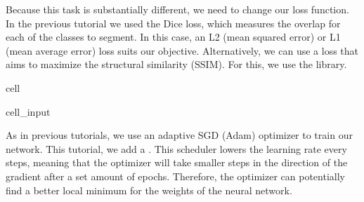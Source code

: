 \documentclass[letterpaper,10pt,english]{jupyterBook}
\begin{document}
\sphinxAtStartPar
Because this task is substantially different, we need to change our loss function. In the previous tutorial we used the Dice loss, which measures the overlap for each of the classes to segment. In this case, an L2 (mean squared error) or L1 (mean average error) loss suits our objective. Alternatively, we can use a loss that aims to maximize the structural similarity (SSIM). For this, we use the  library.

\begin{sphinxuseclass}{cell}\begin{sphinxVerbatimInput}

\begin{sphinxuseclass}{cell_input}
\begin{sphinxVerbatim}[commandchars=\\\{\}]
  


  
\end{sphinxVerbatim}

\end{sphinxuseclass}\end{sphinxVerbatimInput}

\end{sphinxuseclass}
\sphinxAtStartPar
As in previous tutorials, we use an adaptive SGD (Adam) optimizer to train our network. This tutorial, we add a . This scheduler lowers the learning rate every  steps, meaning that the optimizer will take smaller steps in the direction of the gradient after a set amount of epochs. Therefore, the optimizer can potentially find a better local minimum for the weights of the neural network.
\end{document}
